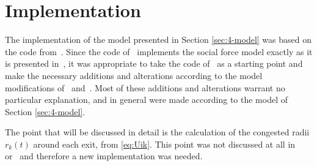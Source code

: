 \section{Implementation}
The implementation of the model presented in Section \ref{sec:4-model} was based on the code from~\citet{Hardmeier2012}. Since the code of~\citet{Hardmeier2012} implements the social force model exactly as it is presented in~\citet{Helbing2000}, it was appropriate to take the code of~\citet{Hardmeier2012} as a starting point and make the necessary additions and alterations according to the model modifications of~\citet{Zainuddin2010} and~\citet{Wang2016}. Most of these additions and alterations warrant no particular explanation, and in general were made according to the model of Section \ref{sec:4-model}.

The point that will be discussed in detail is the calculation of the congested radii $r_k(t)$ around each exit, from \eqref{eq:Uik}. This point was not discussed at all in~\citet{Zainuddin2010} or~\citet{Wang2016} and therefore a new implementation was needed.
